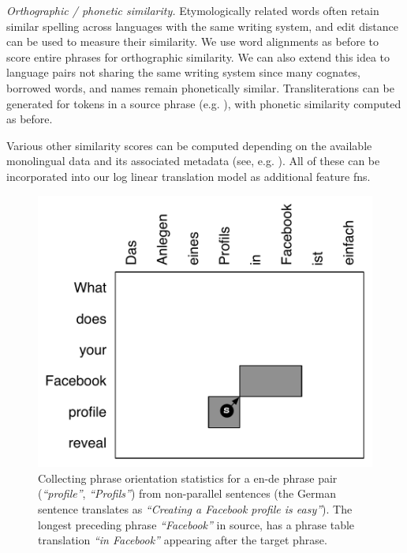 \documentclass[11pt]{article}
\newcommand{\mtodo}[1]{}
\newcommand{\secref}[1]{Section~\ref{#1}}
\newcommand{\emq}[1]{\emph{``#1''}}
\newcommand{\paraheader}[1]{\vskip 0.05in \noindent\emph{#1}}
\newcommand{\skipheader}{\vskip 0.05in}
\begin{document}
\paraheader{Orthographic / phonetic similarity.} Etymologically related words often retain similar spelling across languages with the same writing system, and edit distance can be used to measure their similarity.  We use word alignments as before to score entire phrases for orthographic similarity.\mtodo{Not done quite the same as above but will glance over it.} We can also extend this idea to language pairs not sharing the same writing system since many cognates, borrowed words, and names remain phonetically similar.  Transliterations can be generated for tokens in a source phrase (e.g. \cite{Knight1997}), with phonetic similarity computed as before.

Various other similarity scores can be computed depending on the available monolingual data and its associated metadata (see, e.g. ). All of these can be incorporated into our log linear translation model as additional feature fns.



\begin{figure}[t]
\begin{center}
\includegraphics[width=0.8 \linewidth]{../figures/monoreord/monoreord.pdf}
\caption{Collecting phrase orientation statistics for a en-de phrase pair (\emq{profile}, \emq{Profils}) from non-parallel sentences (the German sentence translates as  \emq{Creating a Facebook profile is easy}). The longest preceding phrase \emq{Facebook} in source, has a phrase table translation \emq{in Facebook} appearing after the target phrase.}
\label{fig:monoreord}
\end{center}
\vskip -0.2in
\end{figure}
\end{document}
